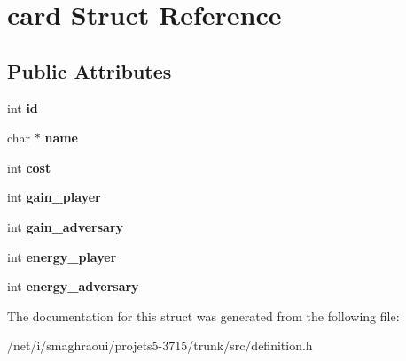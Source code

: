 \hypertarget{structcard}{\section{card Struct Reference}
\label{structcard}
}
\subsection*{Public Attributes}
\begin{DoxyCompactItemize}
\item 
\hypertarget{structcard_a306b8948c43cc52a7e6d2600c907698e}{int {\bfseries id}}\label{structcard_a306b8948c43cc52a7e6d2600c907698e}

\item 
\hypertarget{structcard_ae6380e0bba6a07eff43c71311bebe09e}{char $\ast$ {\bfseries name}}\label{structcard_ae6380e0bba6a07eff43c71311bebe09e}

\item 
\hypertarget{structcard_a82ab18326e015ccd9d1034e42422e502}{int {\bfseries cost}}\label{structcard_a82ab18326e015ccd9d1034e42422e502}

\item 
\hypertarget{structcard_a3fe761cc67c7df2232366f4c0fccac52}{int {\bfseries gain\-\_\-player}}\label{structcard_a3fe761cc67c7df2232366f4c0fccac52}

\item 
\hypertarget{structcard_ae0e6a36ff1d63932baf990bdb88d23ff}{int {\bfseries gain\-\_\-adversary}}\label{structcard_ae0e6a36ff1d63932baf990bdb88d23ff}

\item 
\hypertarget{structcard_af767764cb73d1be3e0c108ae85a6070b}{int {\bfseries energy\-\_\-player}}\label{structcard_af767764cb73d1be3e0c108ae85a6070b}

\item 
\hypertarget{structcard_a787423d52be1a7ffabd9b5bc016a1bc9}{int {\bfseries energy\-\_\-adversary}}\label{structcard_a787423d52be1a7ffabd9b5bc016a1bc9}

\end{DoxyCompactItemize}


The documentation for this struct was generated from the following file\-:\begin{DoxyCompactItemize}
\item 
/net/i/smaghraoui/projets5-\/3715/trunk/src/definition.\-h\end{DoxyCompactItemize}

